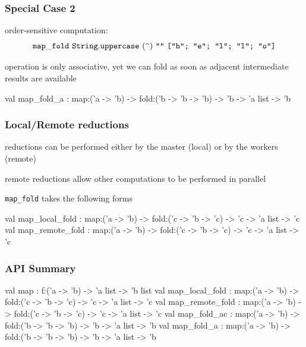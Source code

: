 \documentclass{beamer}
\let\emph\alert
\begin{document}
\begin{frame}\frametitle{Special Case 2}

  \emph{order-sensitive} computation:
  \begin{displaymath}
    \mathtt{map\_fold}~\mathtt{String.uppercase}~(\texttt{\^{}})~\texttt{""}~
    \texttt{["h"; "e"; "l"; "l"; "o"]}
  \end{displaymath}

  operation is only \emph{associative}, yet we can fold as soon as
  adjacent intermediate results are available



\begin{ocaml}
val map_fold_a :
  map:('a -> 'b) -> fold:('b -> 'b -> 'b) -> 
  'b -> 'a list -> 'b
\end{ocaml}
\end{frame}

\begin{frame}\frametitle{Local/Remote reductions}
  reductions can be performed either by the master (local) or by the
  workers (remote)

  \bigskip
  remote reductions allow other computations to be performed in parallel


  \texttt{map\_fold} takes the following forms
  \begin{ocaml}
val map_local_fold :
  map:('a -> 'b) -> fold:('c -> 'b -> 'c) -> 
  'c -> 'a list -> 'c
val map_remote_fold :
  map:('a -> 'b) -> fold:('c -> 'b -> 'c) -> 
  'c -> 'a list -> 'c
  \end{ocaml}
\end{frame}

\begin{frame}\frametitle{API Summary}
  \begin{ocaml}
val map : 
  f:('a -> 'b) -> 'a list -> 'b list
val map_local_fold :
  map:('a -> 'b) -> fold:('c -> 'b -> 'c) -> 
  'c -> 'a list -> 'c
val map_remote_fold :
  map:('a -> 'b) -> fold:('c -> 'b -> 'c) -> 
  'c -> 'a list -> 'c
val map_fold_ac :
  map:('a -> 'b) -> fold:('b -> 'b -> 'b) -> 
  'b -> 'a list -> 'b
val map_fold_a :
  map:('a -> 'b) -> fold:('b -> 'b -> 'b) -> 
  'b -> 'a list -> 'b
  \end{ocaml}
\end{frame}
\end{document}
